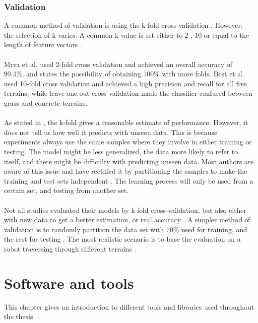 \documentclass[USenglish]{ifimaster}  %
\begin{document}
\subsection{Validation}\label{subseq:validation}
A common method of validation is using the k-fold cross-validation  \cite{DBLP:conf/itat/MrvaF15,6784609,6386243,Hoffmann20141790,6849778,7387710}. However, the selection of k varies. A common k value is set either to 2  \cite{DBLP:conf/itat/MrvaF15,6784609}, 10 \cite{26b23e912c654fe4b7478fd910130195,6386243,Hoffmann20141790,6849778,7387710} or equal to the length of feature vectors \cite{26b23e912c654fe4b7478fd910130195}.
\\
\\
Mrva et al. \cite{DBLP:conf/itat/MrvaF15} used 2-fold cross validation and achieved an overall accuracy of 99.4\%, and states the possibility of obtaining 100\% with more folds. Best et al. \cite{26b23e912c654fe4b7478fd910130195} used 10-fold cross validation and achieved a high precision and recall for all five terrains, while leave-one-out-cross validation made the classifier confused between grass and concrete terrains. 
\\
\\
As stated in \cite{7387710}, the k-fold gives a reasonable estimate of performance. However, it does not tell us how well it predicts with unseen data. This is because experiments always use the same samples where they involve in either training or testing. The model might be less generalized, the data  more likely to refer to itself, and there might be difficulty with predicting unseen data. Most authors are aware of this issue and have rectified it by partitioning the samples to make the training and test sets independent \cite{26b23e912c654fe4b7478fd910130195}. The learning process will only be used from a certain set, and testing from another set.
\\
\\
Not all studies evaluated their models by k-fold cross-validation, but also either with new data to get a better estimation, or real accuracy \cite{5509309,Walas2015,5752869}. A simpler method of validation is to randomly partition the data set with 70\% used for training, and the rest for testing \cite{5752869}. The most realistic scenario is to base the evaluation on a robot traversing through different terrains \cite{DBLP:conf/itat/MrvaF15}.

\chapter{Software and tools} \label{chap:software}
This chapter gives an introduction to different tools and libraries used throughout the thesis.
\end{document}
